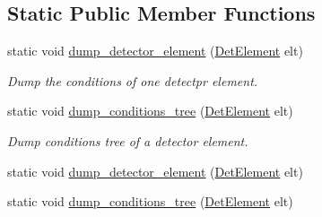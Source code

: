 \subsection*{Static Public Member Functions}
\begin{DoxyCompactItemize}
\item 
static void \hyperlink{struct_d_d4hep_1_1_conditions_1_1_test_1_1_test_env_ab2a1c2b98a13f7f935e4aeb55dadf33a}{dump\_\-detector\_\-element} (\hyperlink{namespace_d_d4hep_a21dd977310ff183f61ca6ae14b59a989}{DetElement} elt)
\begin{DoxyCompactList}\small\item\em Dump the conditions of one detectpr element. \item\end{DoxyCompactList}\item 
static void \hyperlink{struct_d_d4hep_1_1_conditions_1_1_test_1_1_test_env_ad3463aa0bb52943b896e9410019d4a5f}{dump\_\-conditions\_\-tree} (\hyperlink{namespace_d_d4hep_a21dd977310ff183f61ca6ae14b59a989}{DetElement} elt)
\begin{DoxyCompactList}\small\item\em Dump conditions tree of a detector element. \item\end{DoxyCompactList}\item 
static void \hyperlink{struct_d_d4hep_1_1_conditions_1_1_test_1_1_test_env_aa21613eb3a5e779b69819c285344a2a7}{dump\_\-detector\_\-element} (\hyperlink{namespace_d_d4hep_a21dd977310ff183f61ca6ae14b59a989}{DetElement} elt)
\item 
static void \hyperlink{struct_d_d4hep_1_1_conditions_1_1_test_1_1_test_env_a1cabe62789776e1356609988fcb03442}{dump\_\-conditions\_\-tree} (\hyperlink{namespace_d_d4hep_a21dd977310ff183f61ca6ae14b59a989}{DetElement} elt)
\end{DoxyCompactItemize}
